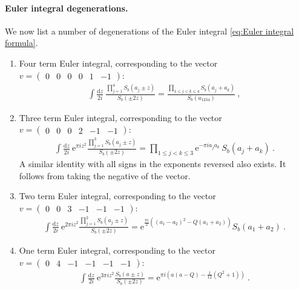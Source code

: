 \documentclass[12pt,a4paper]{article}
\begin{document}
\paragraph{Euler integral degenerations.} We now list a number of degenerations of the Euler integral \eqref{eq:Euler integral formula}. 
\begin{enumerate}
    \item Four term Euler integral, corresponding to the vector $v=\begin{pmatrix}
        0 & 0 & 0 & 0 & 1 & -1
    \end{pmatrix}$:
    \begin{align}
        \int\frac{\mathrm{d} z}{2i}\  \frac{\prod_{j=1}^4 S_b(a_j \pm z)}{S_b(\pm 2z)}=\frac{\prod_{1 \le j<k \le 4} S_b(a_j+a_k)}{S_b(a_{1234})}\ , \label{eq:S_b beta integral identity 4 a}
    \end{align}
    \item Three term Euler integral, corresponding to the vector $v=\begin{pmatrix}
        0 & 0 & 0 & 2 & -1 & -1
    \end{pmatrix}$:
    \begin{align}
    \int \frac{\mathrm{d} z}{2i}\  \mathrm{e}^{\pi i z^2} \frac{\prod_{j=1}^3 S_b(a_j \pm z)}{S_b(\pm 2z)}=\prod_{1 \le j<k \le 3} \mathrm{e}^{-\pi i a_j a_k}\, S_b(a_j+a_k)\ . \label{eq:S_b beta integral identity 3 a}
    \end{align}
    A similar identity with all signs in the exponents reversed also exists. It follows from taking the negative of the vector.
    \item Two term Euler integral, corresponding to the vector $v=\begin{pmatrix}
        0 & 0 & 3 & -1 & -1 & -1
    \end{pmatrix}$:
    \begin{align}
     \int \frac{\mathrm{d} z}{2i}\  \mathrm{e}^{2\pi i z^2} \frac{\prod_{j=1}^2 S_b(a_j \pm z)}{S_b(\pm 2z)}=\mathrm{e}^{\frac{\pi i}{2}\left((a_1-a_2)^2-Q(a_1+a_2)\right)} S_b(a_1+a_2)\ . \label{eq:S_b beta integral identity 2 a}
    \end{align}
    \item One term Euler integral, corresponding to the vector $v=\begin{pmatrix}
        0 & 4 & -1 & -1 & -1 & -1
    \end{pmatrix}$:
    \begin{align}
     \int\frac{\mathrm{d} z}{2i}\  \mathrm{e}^{3\pi i z^2} \frac{S_b(a \pm z)}{S_b(\pm 2z)}=\mathrm{e}^{\pi i\left(a(a-Q)-\frac{1}{12}(Q^2+1)\right)} \ . \label{eq:S_b beta integral identity 1 a}

\end{align}
\end{enumerate}
\end{document}
